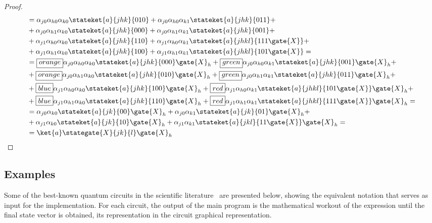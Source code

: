 \begin{proof}
\begin{align*}
        &=\alpha_{j0}\alpha_{h0}\alpha_{k0}\stateket{a}{jhk}{010} +
          \alpha_{j0}\alpha_{h0}\alpha_{k1}\stateket{a}{jhk}{011}+\\
        &+\alpha_{j0}\alpha_{h1}\alpha_{k0}\stateket{a}{jhk}{000} +
          \alpha_{j0}\alpha_{h1}\alpha_{k1}\stateket{a}{jhk}{001}+\\
        &+\alpha_{j1}\alpha_{h0}\alpha_{k0}\stateket{a}{jhk}{110} +
          \alpha_{j1}\alpha_{h0}\alpha_{k1}\stateket{a}{jhkl}{111\gate{X}}+\\
        &+\alpha_{j1}\alpha_{h1}\alpha_{k0}\stateket{a}{jhk}{100} +
          \alpha_{j1}\alpha_{h1}\alpha_{k1}\stateket{a}{jhkl}{101\gate{X}}=\\
        &=\boxed{orange}{\alpha_{j0}\alpha_{h0}\alpha_{k0}\stateket{a}{jhk}{000}\gate{X}_h}+
        \boxed{green}{\alpha_{j0}\alpha_{h0}\alpha_{k1}\stateket{a}{jhk}{001}\gate{X}_h}+\\
        &+\boxed{orange}{\alpha_{j0}\alpha_{h1}\alpha_{k0}\stateket{a}{jhk}{010}\gate{X}_h}+
        \boxed{green}{\alpha_{j0}\alpha_{h1}\alpha_{k1}\stateket{a}{jhk}{011}\gate{X}_h}+\\
        &+\boxed{blue}{\alpha_{j1}\alpha_{h0}\alpha_{k0}\stateket{a}{jhk}{100}\gate{X}_h}+
        \boxed{red}{\alpha_{j1}\alpha_{h0}\alpha_{k1}\stateket{a}{jhkl}{101\gate{X}}\gate{X}_h}+\\
        &+\boxed{blue}{\alpha_{j1}\alpha_{h1}\alpha_{k0}\stateket{a}{jhk}{110}\gate{X}_h}+
        \boxed{red}{\alpha_{j1}\alpha_{h1}\alpha_{k1}\stateket{a}{jhkl}{111\gate{X}}\gate{X}_h}=\\
        &=\alpha_{j0}\alpha_{k0}\stateket{a}{jk}{00}\gate{X}_h+
          \alpha_{j0}\alpha_{k1}\stateket{a}{jk}{01}\gate{X}_h+\\
        &+\alpha_{j1}\alpha_{k0}\stateket{a}{jk}{10}\gate{X}_h+
          \alpha_{j1}\alpha_{k1}\stateket{a}{jkl}{11\gate{X}}\gate{X}_h=\\
        &=\ket{a}\stategate{X}{jk}{l}\gate{X}_h
    \end{align*}
\end{proof}

\subsection{Examples}
Some of the best-known quantum circuits in the scientific literature~\cite{Nielsen_Chuang_2010} are presented below, showing the equivalent notation that serves as input for the implementation. For each circuit, the output of the main program is the mathematical workout of the expression until the final state vector is obtained, its representation in the circuit graphical representation.

